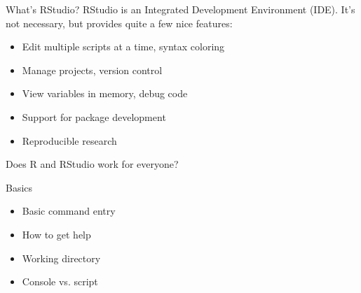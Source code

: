 \documentclass[xcolor=dvipsnames]{beamer}
\begin{document}
\begin{frame}{What's RStudio?}
RStudio is an Integrated Development Environment (IDE). It's not necessary, but provides quite a few nice features:
  \begin{itemize}
    \item Edit multiple scripts at a time, syntax coloring
    \item Manage projects, version control
    \item View variables in memory, debug code
    \item Support for package development
    \item Reproducible research
  \end{itemize}
\end{frame}

\begin{frame}
Does R and RStudio work for everyone?
\end{frame}

\begin{frame}[fragile]{Basics}
  \begin{itemize}
    \item Basic command entry
    \item How to get help
    \item Working directory
    \item Console vs. script
  \end{itemize}
\end{frame}
\end{document}
